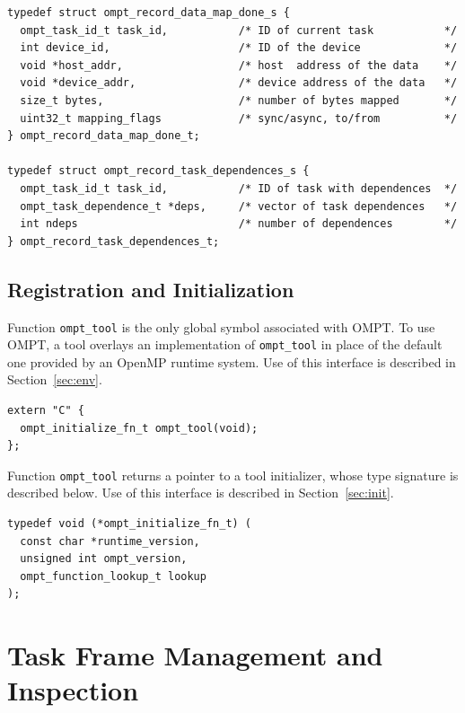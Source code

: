 \documentclass{article}
\begin{document}
{\begin{verbatim}
typedef struct ompt_record_data_map_done_s {
  ompt_task_id_t task_id,           /* ID of current task           */
  int device_id,                    /* ID of the device             */
  void *host_addr,                  /* host  address of the data    */
  void *device_addr,                /* device address of the data   */ 
  size_t bytes,                     /* number of bytes mapped       */
  uint32_t mapping_flags            /* sync/async, to/from          */
} ompt_record_data_map_done_t;

typedef struct ompt_record_task_dependences_s {
  ompt_task_id_t task_id,           /* ID of task with dependences  */
  ompt_task_dependence_t *deps,     /* vector of task dependences   */
  int ndeps                         /* number of dependences        */
} ompt_record_task_dependences_t;
\end{verbatim}

\clearpage
\subsection{Registration and Initialization} 
\label{sec:app:init}

\noindent
Function \verb|ompt_tool| is the only global symbol associated with OMPT. To use OMPT, a tool overlays an implementation of \verb|ompt_tool| in place of the default one provided by an OpenMP runtime system. Use of this interface is described in Section~\ref{sec:env}.
\begin{verbatim}
extern "C" {
  ompt_initialize_fn_t ompt_tool(void);
};
\end{verbatim}
Function \verb|ompt_tool| returns a pointer to a tool initializer, whose type signature is described below. Use of this interface is described in Section~\ref{sec:init}.

\begin{verbatim}
typedef void (*ompt_initialize_fn_t) (
  const char *runtime_version, 
  unsigned int ompt_version,
  ompt_function_lookup_t lookup 
);
\end{verbatim}



\clearpage
\section{Task Frame Management and Inspection}
\label{app:frame}

}
\end{document}
